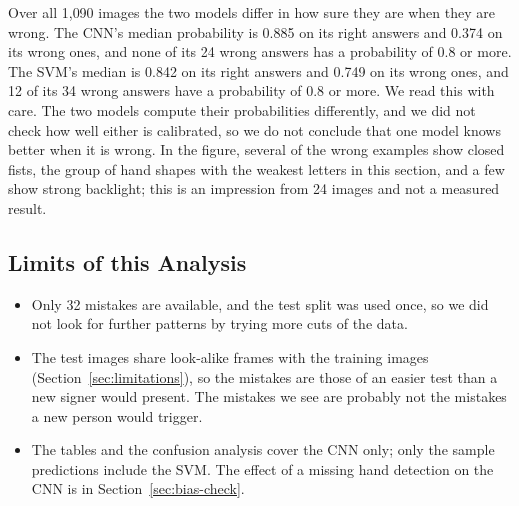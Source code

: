 
Over all 1{,}090 images the two models differ in how sure they are when they are wrong. The CNN's median probability is 0.885 on its right answers and 0.374 on its wrong ones, and none of its 24 wrong answers has a probability of 0.8 or more. The SVM's median is 0.842 on its right answers and 0.749 on its wrong ones, and 12 of its 34 wrong answers have a probability of 0.8 or more. We read this with care. The two models compute their probabilities differently, and we did not check how well either is calibrated, so we do not conclude that one model knows better when it is wrong. In the figure, several of the wrong examples show closed fists, the group of hand shapes with the weakest letters in this section, and a few show strong backlight; this is an impression from 24 images and not a measured result.

\subsection{Limits of this Analysis}
\begin{itemize}
  \item Only 32 mistakes are available, and the test split was used once, so we did not look for further patterns by trying more cuts of the data.
  \item The test images share look-alike frames with the training images (Section~\ref{sec:limitations}), so the mistakes are those of an easier test than a new signer would present. The mistakes we see are probably not the mistakes a new person would trigger.
  \item The tables and the confusion analysis cover the CNN only; only the sample predictions include the SVM. The effect of a missing hand detection on the CNN is in Section~\ref{sec:bias-check}.
\end{itemize}
